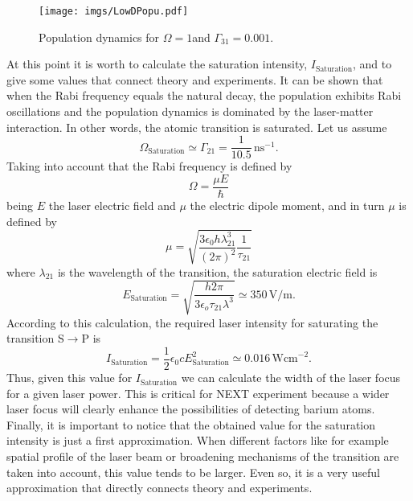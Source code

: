 \begin{figure}[ht!]
\begin{center}
\texttt{[image: imgs/LowDPopu.pdf]}
\caption{\label{LowDPopu} Population dynamics for $\Omega=1$\ns and  $\Gamma_{31}=0.001$\ns.}
\end{center}
\end{figure}
 
At this point it is worth to calculate the saturation intensity, $I_{\text{Saturation}}$, and to give some values that connect theory and experiments. It can be shown \cite{Sh90} that when the Rabi frequency equals the natural decay, the population exhibits Rabi oscillations and the population dynamics is dominated by the laser-matter interaction. In other words, the atomic transition is saturated. Let us assume 
\begin{equation}
\Omega_{\text{Saturation}}\simeq\Gamma_{21}=\frac{1}{10.5}\,\text{ns}^{-1}.
\end{equation}
Taking into account that the Rabi frequency is defined by
\begin{equation}
\Omega=\frac{\mu E}{\hbar}
\end{equation}
being $E$ the laser electric field and $\mu$ the electric dipole moment, and in turn $\mu$ is defined by
\begin{equation}
\mu=\sqrt{\frac{3\epsilon_0 h \lambda_{21}^3}{(2\pi)^2}\frac{1}{\tau_{21}}}
\end{equation}
where $\lambda_{21}$ is the wavelength of the transition, the saturation electric field is
\begin{equation}
E_{\text{Saturation}}=\sqrt{\frac{h2\pi}{3\epsilon_o\tau_{21}\lambda^3}}\simeq350\,\text{V/m}.
\end{equation}
According to this calculation, the required laser intensity for saturating the transition S$\rightarrow$P is
\begin{equation}
I_{\text{Saturation}}=\frac{1}{2}\epsilon_0cE^2_{\text{Saturation}}\simeq0.016\,\text{Wcm}^{-2}.
\end{equation}
Thus, given this value for $I_{\text{Saturation}}$ we can calculate the width of the laser focus for a given laser power. This is critical for NEXT experiment because a wider laser focus will clearly enhance the possibilities of detecting barium atoms. Finally, it is important to notice that the obtained value for the saturation intensity is just a first approximation. When different factors like for example spatial profile of the laser beam or broadening mechanisms of the transition are taken into account, this value tends to be larger. Even so, it is a very useful approximation that directly connects theory and experiments.


